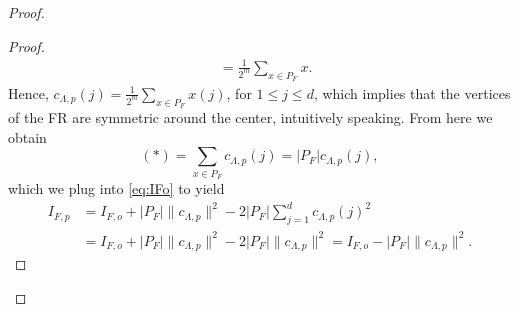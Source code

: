 \begin{proof}
\begin{proof}
\begin{align*}
      & =\frac{1}{2^m}\sum_{x\in P_F}x.%
    \end{align*}
    Hence, $c_{\Lambda,p}(j)=\frac{1}{2^m} \sum_{x\in P_F}x(j)$, for $1\leq j\leq d$, 
    which implies that the vertices of the FR are symmetric around the center, intuitively speaking. From here we obtain
    \[(*)=\sum_{x\in P_F} c_{\Lambda,p}(j)=|P_F|c_{\Lambda,p}(j),\]
which we plug into \eqref{eq:IFo} to yield
    \begin{align*}
        I_{F,p}&=  I_{F,o} + |P_F|\|c_{\Lambda,p}\|^2 - 2 |P_F|\sum_{j=1}^d c_{\Lambda,p}(j)^2 \\
        &= I_{F,o} + |P_F|\|c_{\Lambda,p}\|^2 - 2|P_F|\|c_{\Lambda,p}\|^2 = I_{F,o} - |P_F|\|c_{\Lambda,p}\|^2.
    \end{align*}
\end{proof}


\end{proof}
